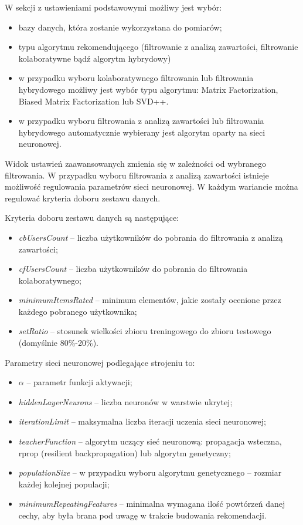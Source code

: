 \documentclass[twoside]{iisthesis}
\begin{document}
		W sekcji z ustawieniami podstawowymi możliwy jest wybór:
		\begin{itemize}
			\item bazy danych, która zostanie wykorzystana do pomiarów;
			\item typu algorytmu rekomendującego (filtrowanie z analizą zawartości, filtrowanie kolaboratywne bądź algorytm hybrydowy)
			\item w przypadku wyboru kolaboratywnego filtrowania lub filtrowania hybrydowego możliwy jest wybór typu algorytmu: Matrix Factorization, Biased Matrix Factorization lub SVD++.
			\item w przypadku wyboru filtrowania z analizą zawartości lub filtrowania hybrydowego automatycznie wybierany jest algorytm oparty na sieci neuronowej. 
		\end{itemize}
		 
		 Widok ustawień zaawansowanych zmienia się w zależności od wybranego filtrowania. W przypadku wyboru filtrowania z analizą zawartości istnieje możliwość regulowania parametrów sieci neuronowej. W każdym wariancie można regulować kryteria doboru zestawu danych.
		 
		 Kryteria doboru zestawu danych są następujące:
		 
		 \begin{itemize}
		 	\item \textit{cbUsersCount} -- liczba użytkowników do pobrania do filtrowania z analizą zawartości;
		 	\item \textit{cfUsersCount} -- liczba użytkowników do pobrania do filtrowania kolaboratywnego;
		 	\item \textit{minimumItemsRated} -- minimum elementów, jakie zostały ocenione przez każdego pobranego użytkownika;
		 	\item \textit{setRatio} -- stosunek wielkości zbioru treningowego do zbioru testowego (domyślnie 80\%-20\%).
		 \end{itemize}
		 
		 Parametry sieci neuronowej podlegające strojeniu to:

		 \begin{itemize}
		 	\item $\alpha$ -- parametr funkcji aktywacji;
		 	\item \textit{hiddenLayerNeurons} -- liczba neuronów w warstwie ukrytej;
		 	\item \textit{iterationLimit} -- maksymalna liczba iteracji uczenia sieci neuronowej;
		 	\item \textit{teacherFunction} -- algorytm uczący sieć neuronową: propagacja wsteczna, rprop (resilient backpropagation) lub algorytm genetyczny;
		 	\item \textit{populationSize} -- w przypadku wyboru algorytmu genetycznego -- rozmiar każdej kolejnej populacji;
		 	\item \textit{minimumRepeatingFeatures} -- minimalna wymagana ilość powtórzeń danej cechy, aby była brana pod uwagę w trakcie budowania rekomendacji.
		 \end{itemize}	 
		
\end{document}
